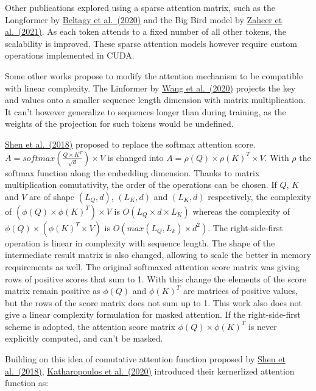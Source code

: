 Other publications explored using a sparse attention matrix, such as the
Longformer by \href{https://arxiv.org/abs/2004.05150}{Beltagy et
al.~(2020)} and the Big Bird model by
\href{https://arxiv.org/abs/2007.14062}{Zaheer et al.~(2021)}. As each
token attends to a fixed number of all other tokens, the scalability is
improved. These sparse attention models however require custom
operations implemented in CUDA.

Some other works propose to modify the attention mechanism to be
compatible with linear complexity. The Linformer by
\href{https://arxiv.org/abs/2006.04768}{Wang et al.~(2020)} projects the
key and values onto a smaller sequence length dimension with matrix
multiplication. It can't however generalize to sequences longer than
during training, as the weights of the projection for such tokens would
be undefined.

\href{https://arxiv.org/abs/1812.01243}{Shen et al.~(2018)} proposed to
replace the softmax attention score.
\(A = softmax\left(\frac{Q \times K^T}{\sqrt{d}}\right) \times V\) is
changed into \(A = \rho(Q) \times \rho(K)^T \times V\). With \(\rho\)
the softmax function along the embedding dimension. Thanks to matrix
multiplication comutativity, the order of the operations can be chosen.
If \(Q\), \(K\) and \(V\) are of shape \((L_Q, d)\), \((L_K, d)\) and
\((L_K, d)\) respectively, the complexity of
\((\phi(Q) \times \phi(K)^T) \times V\) is
\(O(L_Q \times d \times L_K)\) whereas the complexity of
\(\phi(Q) \times (\phi(K)^T \times V)\) is
\(O\left(max(L_Q, L_k) \times d^2 \right)\). The right-side-first
operation is linear in complexity with sequence length. The shape of the
intermediate result matrix is also changed, allowing to scale the better
in memory requirements as well. The original softmaxed attention score
matrix was giving rows of positive scores that sum to 1. With this
change the elements of the score matrix remain positive as \(\phi(Q)\)
and \(\phi(K)^T\) are matrices of positive values, but the rows of the
score matrix does not sum up to 1. This work also does not give a linear
complexity formulation for masked attention. If the right-side-first
scheme is adopted, the attention score matrix
\(\phi(Q) \times \phi(K)^T\) is never explicitly computed, and can't be
masked.

Building on this idea of comutative attention function proposed by
\href{https://arxiv.org/abs/1812.01243}{Shen et al.~(2018)},
\href{https://arxiv.org/abs/2006.16236}{Katharopoulos et al.~(2020)}
introduced their kernerlized attention function as:

